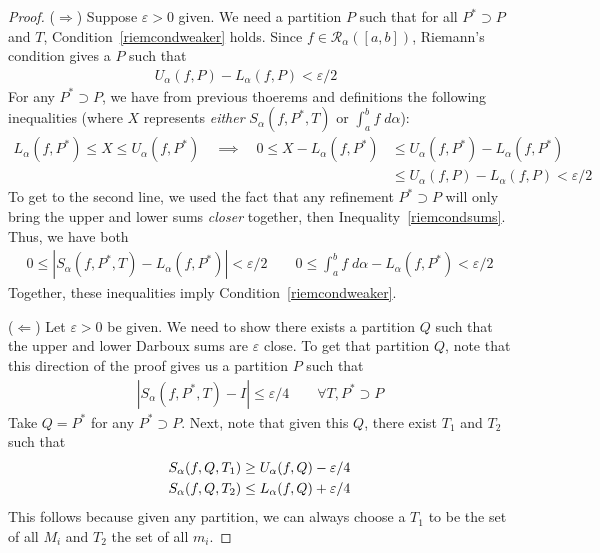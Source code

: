 \documentclass[12pt]{book}
\numberwithin{equation}{section} %
\theoremstyle{plain}
\theoremstyle{definition}
\theoremstyle{remark}
\begin{document}
\begin{proof}
($\Rightarrow$)
Suppose $\varepsilon>0$ given.
We need a partition $P$ such that for all $P^*\supset P$ and $T$,
Condition~\ref{riemcondweaker} holds.
Since $f\in\mathscr{R}_\alpha([a,b])$, Riemann's condition gives a $P$
such that
\begin{align}
  U_\alpha(f,P) - L_\alpha(f,P)<\varepsilon/2 \qquad
  \label{riemcondsums}
\end{align}
For any $P^*\supset P$, we have from previous thoerems and definitions
the following inequalities (where $X$ represents \emph{either}
$S_\alpha(f,P^*,T)$ or $\int^b_af\; d\alpha$):
\begin{align*}
  L_\alpha(f,P^*)\leq X \leq U_\alpha(f,P^*)
  \quad\implies\quad
  0\leq X-L_\alpha(f,P^*)
  &\leq U_\alpha(f,P^*)-L_\alpha(f,P^*) \\
  &\leq U_\alpha(f,P)-L_\alpha(f,P)
  < \varepsilon/2
\end{align*}
To get to the second line, we used the fact that any refinement
$P^*\supset P$ will only bring the upper and lower sums \emph{closer}
together, then Inequality~\ref{riemcondsums}.
Thus, we have both
\begin{align*}
  0\leq
  \left\lvert S_\alpha(f,P^*,T)-L_\alpha(f,P^*)\right\rvert
  <\varepsilon/2
  \qquad
  0\leq \int^b_a f\; d\alpha-L_\alpha(f,P^*) <\varepsilon/2
\end{align*}
Together, these inequalities imply Condition~\ref{riemcondweaker}.

($\Leftarrow$)
Let $\varepsilon>0$ be given. We need to show there exists a partition
$Q$ such that the upper and lower Darboux sums are $\varepsilon$ close.
To get that partition $Q$, note that this direction of the proof gives
us a partition $P$ such that
\begin{align*}
  |S_\alpha(f,P^*,T)-I|\leq \varepsilon/4
  \qquad\forall T,P^*\supset P
\end{align*}
Take $Q=P^*$ for any $P^*\supset P$.
Next, note that given this $Q$, there exist $T_1$ and $T_2$ such that
\begin{align}
    S_\alpha(f,Q,T_1) &\geq U_\alpha(f,Q) - \varepsilon/4\notag\\
    S_\alpha(f,Q,T_2) &\leq L_\alpha(f,Q) + \varepsilon/4
    \label{proof1.17}
\end{align}
This follows because given any partition, we can always choose a $T_1$
to be the set of all $M_i$ and $T_2$ the set of all $m_i$.


\end{proof}
\end{document}
